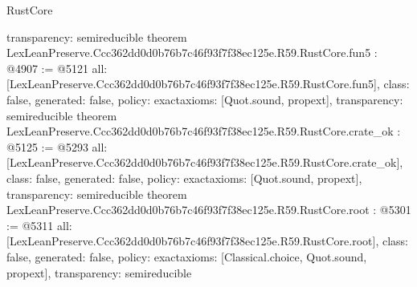 \begin{lexlean}{RustCore}
\begin{coremodule}
{  transparency: semireducible
}
theorem LexLeanPreserve.Ccc362dd0d0b76b7c46f93f7f38ec125e.R59.RustCore.fun5 : @4907 := @5121 {
  all: [LexLeanPreserve.Ccc362dd0d0b76b7c46f93f7f38ec125e.R59.RustCore.fun5],
  class: false,
  generated: false,
  policy: exact{axioms: [Quot.sound, propext]},
  transparency: semireducible
}
theorem LexLeanPreserve.Ccc362dd0d0b76b7c46f93f7f38ec125e.R59.RustCore.crate_ok : @5125 := @5293 {
  all: [LexLeanPreserve.Ccc362dd0d0b76b7c46f93f7f38ec125e.R59.RustCore.crate_ok],
  class: false,
  generated: false,
  policy: exact{axioms: [Quot.sound, propext]},
  transparency: semireducible
}
theorem LexLeanPreserve.Ccc362dd0d0b76b7c46f93f7f38ec125e.R59.RustCore.root : @5301 := @5311 {
  all: [LexLeanPreserve.Ccc362dd0d0b76b7c46f93f7f38ec125e.R59.RustCore.root],
  class: false,
  generated: false,
  policy: exact{axioms: [Classical.choice, Quot.sound, propext]},
  transparency: semireducible
}


\end{coremodule}
\end{lexlean}
